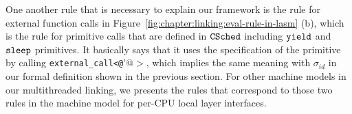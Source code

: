 One another rule that is necessary to explain our framework is the rule for external function calls in Figure~\ref{fig:chapter:linking:eval-rule-in-lasm} (b),
which is the rule for primitive calls that are defined in ${{\mathrm{\texttt{CSched}}}}$ including ${\mathrm{\texttt{yield}}}$ and ${\mathrm{\texttt{sleep}}}$ primitives.
It basically says that it uses 
the specification of the primitive by calling \lstinline$external_call<@$'$@>$,
which implies the same meaning with $\sigma_{id}$ in our formal definition shown in the previous section.
For other machine models in our multithreaded linking,
we presents the rules that correspond to those two rules in the machine model for per-CPU local layer interfaces.




%
%
